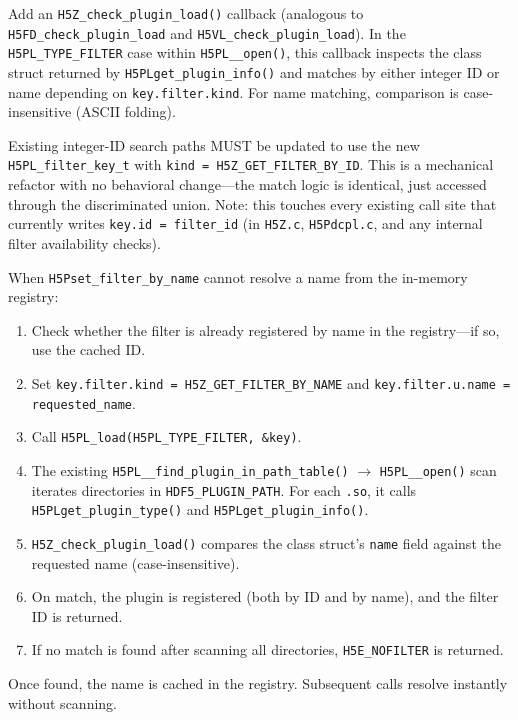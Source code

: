 \documentclass[../HDF5_RFC.tex]{subfiles}
\begin{document}
Add an \texttt{H5Z\_check\_plugin\_load()} callback (analogous to
\texttt{H5FD\_check\_plugin\_load} and \texttt{H5VL\_check\_plugin\_load}). In the
\texttt{H5PL\_TYPE\_FILTER} case within \texttt{H5PL\_\_open()}, this callback inspects the
class struct returned by \texttt{H5PLget\_plugin\_info()} and matches by either integer
ID or name depending on \texttt{key.filter.kind}. For name matching, comparison is
case-insensitive (ASCII folding).

Existing integer-ID search paths MUST be updated to use the new
\texttt{H5PL\_filter\_key\_t} with \texttt{kind = H5Z\_GET\_FILTER\_BY\_ID}. This is a mechanical
refactor with no behavioral change---the match logic is identical, just
accessed through the discriminated union. Note: this touches every existing
call site that currently writes \texttt{key.id = filter\_id} (in \texttt{H5Z.c},
\texttt{H5Pdcpl.c}, and any internal filter availability checks).

When \texttt{H5Pset\_filter\_by\_name} cannot resolve a name
from the in-memory registry:

\begin{enumerate}
\item Check whether the filter is already registered by name in the registry---if
  so, use the cached ID.
\item Set \texttt{key.filter.kind = H5Z\_GET\_FILTER\_BY\_NAME} and
  \texttt{key.filter.u.name = requested\_name}.
\item Call \texttt{H5PL\_load(H5PL\_TYPE\_FILTER, \&key)}.
\item The existing \texttt{H5PL\_\_find\_plugin\_in\_path\_table()} $\rightarrow$
  \texttt{H5PL\_\_open()} scan iterates directories in \texttt{HDF5\_PLUGIN\_PATH}. For each
  \texttt{.so}, it calls \texttt{H5PLget\_plugin\_type()} and \texttt{H5PLget\_plugin\_info()}.
\item \texttt{H5Z\_check\_plugin\_load()} compares the class struct's \texttt{name} field
  against the requested name (case-insensitive).
\item On match, the plugin is registered (both by ID and by name), and the
  filter ID is returned.
\item If no match is found after scanning all directories, \texttt{H5E\_NOFILTER} is
  returned.
\end{enumerate}

Once found, the name is cached in the registry. Subsequent calls resolve
instantly without scanning.
\end{document}
